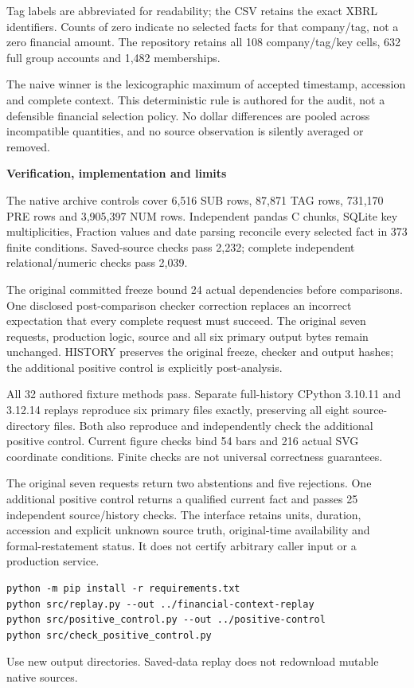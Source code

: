 \documentclass[11pt,letterpaper]{article}
\newcommand{\heading}[1]{\vspace{4pt}{\large\bfseries #1}\par}
\newcommand{\BoundEH}{108}
\newcommand{\BoundEI}{632}
\newcommand{\BoundEJ}{1,482}
\newcommand{\BoundEK}{6,516}
\newcommand{\BoundEL}{87,871}
\newcommand{\BoundEM}{731,170}
\newcommand{\BoundEN}{3,905,397}
\newcommand{\BoundEO}{373}
\newcommand{\BoundEP}{2,232}
\newcommand{\BoundEQ}{2,039}
\newcommand{\BoundER}{24}
\newcommand{\BoundES}{32}
\newcommand{\BoundET}{3.10.11}
\newcommand{\BoundEU}{3.12.14}
\newcommand{\BoundEV}{54}
\newcommand{\BoundEW}{216}
\newcommand{\BoundEX}{25}
\begin{document}
Tag labels are abbreviated for readability; the CSV retains the exact XBRL identifiers. Counts of zero indicate no selected facts for that company/tag, not a zero financial amount. The repository retains all \BoundEH{} company/tag/key cells, \BoundEI{} full group accounts and \BoundEJ{} memberships.

The naive winner is the lexicographic maximum of accepted timestamp, accession and complete context. This deterministic rule is authored for the audit, not a defensible financial selection policy. No dollar differences are pooled across incompatible quantities, and no source observation is silently averaged or removed.
\newpage
{\Large\bfseries Verification, implementation and limits\par}
\heading{Independent evidence}
The native archive controls cover \BoundEK{} SUB rows, \BoundEL{} TAG rows, \BoundEM{} PRE rows and \BoundEN{} NUM rows. Independent pandas C chunks, SQLite key multiplicities, Fraction values and date parsing reconcile every selected fact in \BoundEO{} finite conditions. Saved-source checks pass \BoundEP{}; complete independent relational/numeric checks pass \BoundEQ{}.

The original committed freeze bound \BoundER{} actual dependencies before comparisons. One disclosed post-comparison checker correction replaces an incorrect expectation that every complete request must succeed. The original seven requests, production logic, source and all six primary output bytes remain unchanged. HISTORY preserves the original freeze, checker and output hashes; the additional positive control is explicitly post-analysis.

All \BoundES{} authored fixture methods pass. Separate full-history CPython \BoundET{} and \BoundEU{} replays reproduce six primary files exactly, preserving all eight source-directory files. Both also reproduce and independently check the additional positive control. Current figure checks bind \BoundEV{} bars and \BoundEW{} actual SVG coordinate conditions. Finite checks are not universal correctness guarantees.

\heading{Runnable implementation exercise}
The original seven requests return two abstentions and five rejections. One additional positive control returns a qualified current fact and passes \BoundEX{} independent source/history checks. The interface retains units, duration, accession and explicit unknown source truth, original-time availability and formal-restatement status. It does not certify arbitrary caller input or a production service.
\begin{verbatim}
python -m pip install -r requirements.txt
python src/replay.py --out ../financial-context-replay
python src/positive_control.py --out ../positive-control
python src/check_positive_control.py
\end{verbatim}
Use new output directories. Saved-data replay does not redownload mutable native sources.
\end{document}
